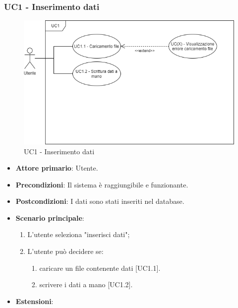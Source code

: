 \subsubsection{UC1 - Inserimento dati}
\begin{figure}[h]
\includegraphics[width=\linewidth]{Section/Images/UC1InserimentoDati.png}
\centering
\caption{UC1 - Inserimento dati}
\end{figure}
\begin{itemize}
	\item \textbf{Attore primario}: Utente.
	\item \textbf{Precondizioni}: Il sistema è raggiungibile e funzionante.
	\item \textbf{Postcondizioni}: I dati sono stati inseriti nel database.
	\item \textbf{Scenario principale}:
		\begin{enumerate}
			\item L'utente seleziona "inserisci dati";
			\item L'utente può decidere se:
			\begin{enumerate}
			\item caricare un file contenente dati [UC1.1].
			\item scrivere i dati a mano [UC1.2].
			\end{enumerate}
		\end{enumerate}
	\item \textbf{Estensioni}:
\end{itemize}